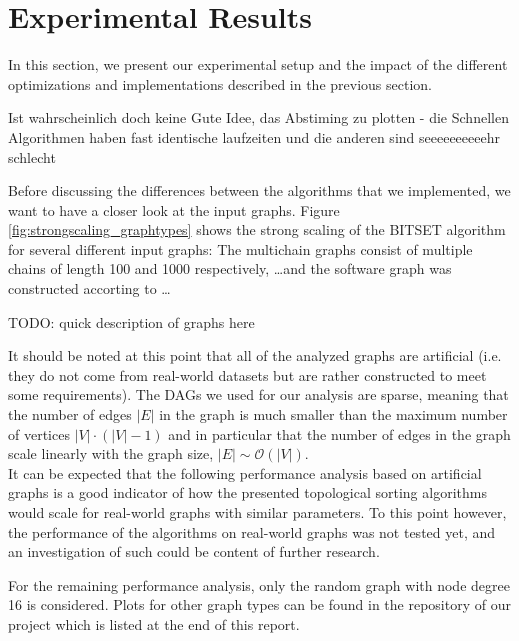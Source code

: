 \section{Experimental Results}\label{sec:exp}
%
In this section, we present our experimental setup and the impact of the different optimizations and implementations described in the previous section.
\par\medskip
%
\begin{invisible}
	Ist wahrscheinlich doch keine Gute Idee, das Abstiming zu plotten - die Schnellen Algorithmen haben fast identische laufzeiten und die anderen sind seeeeeeeeeehr schlecht
\end{invisible}
%
 Before discussing the differences between the algorithms that we implemented, we want to have a closer look at the input graphs.
Figure \ref{fig:strongscaling_graphtypes} shows the strong scaling of the BITSET algorithm for several different input graphs:
The multichain graphs consist of multiple chains of length 100 and 1000 respectively, \ldots and the software graph was constructed accorting to \ldots \\
\begin{invisible}
	{\Large TODO:} quick description of graphs here
\end{invisible}
It should be noted at this point that all of the analyzed graphs are artificial (i.e. they do not come from real-world datasets but are rather constructed to meet some requirements).
The DAGs we used for our analysis are sparse, meaning that the number of edges $|E|$ in the graph is much smaller than the maximum number of vertices $|V|\cdot(|V|-1)$ and in particular that the number of edges in the graph scale linearly with the graph size, $|E| \sim \mathcal{O} ( |V| )$. \\
It can be expected that the following performance analysis based on artificial graphs is a good indicator of how the presented topological sorting algorithms would scale for real-world graphs with similar parameters.
To this point however, the performance of the algorithms on real-world graphs was not tested yet, and an investigation of such could be content of further research.
\par\medskip
%
For the remaining performance analysis, only the random graph with node degree 16 is considered.
Plots for other graph types can be found in the repository of our project which is listed at the end of this report.

 
